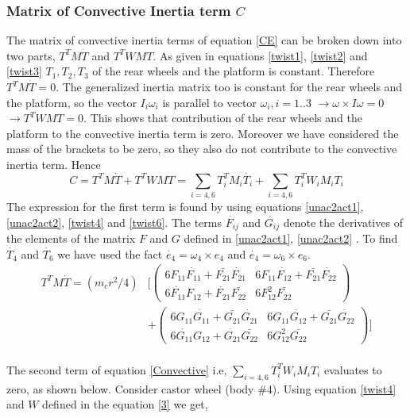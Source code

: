 \subsubsection{Matrix of Convective Inertia term $C$}
The matrix of convective inertia terms of equation \ref{CE} can be broken down into two parts, $T^TM\dot{T}$ and $T^TWMT$.  As given in equations \ref{twist1}, \ref{twist2} and \ref{twist3} $T_1,T_2,T_3$ of the rear wheels and the platform is constant. Therefore $T^TM\dot{T}=0$. The generalized inertia matrix too is constant for the rear wheels and the platform, so the vector $I_i\omega_i$ is parallel to vector $\omega_i, i=1..3$ $\rightarrow\omega\times I\omega=0$ $\rightarrow T^TWMT =0$. This shows that contribution of the rear wheels and the platform  to the convective inertia term is zero. Moreover we have considered the mass of the brackets to be zero, so they also do not contribute to the convective inertia term. Hence
\begin{equation}
\label{Convective}
C=T^TM\dot{T}+T^TWMT=\sum_{i=4,6}T^T_iM_i\dot{T_i}+\sum_{i=4,6}T_i^TW_iM_iT_i
\end{equation}
The expression for the first term is found by using equations \ref{unac2act1}, \ref{unac2act2}, \ref{twist4} and \ref{twist6}. The terms $\dot{F_{ij}}$ and $\dot{G_{ij}}$ denote the derivatives of the elements of the matrix $F$ and $G$ defined in \ref{unac2act1}, \ref{unac2act2} . To find $\dot{T_4}$ and  $ \dot{T_6}$ we have used the fact $\dot{e_4}=\omega_4 \times e_4 $ and $\dot{e_4}=\omega_6 \times e_6 $. 
\begin{equation}
\label{corr1}
\begin{split}
T^TM\dot{T}=
(m_cr^2/4)& \biggl[ \begin{pmatrix}
6F_{11}\dot{F_{11}}+\bar{F_{21}}\dot{F_{21}} & 6F_{11}\dot{F_{12}}+\bar{F_{21}}\dot{F_{22}}\\
6\dot{F_{11}}F_{12}+\dot{F_{21}}\bar{F_{22}} & 6F_{12}^2\bar{F_{22}}
\end{pmatrix}\\
&+\begin{pmatrix}
6G_{11}\dot{G_{11}}+\bar{G_{21}}\dot{G_{21}} & 6G_{11}\dot{G_{12}}+\bar{G_{21}}\dot{G_{22}}\\
6\dot{G_{11}}G_{12}+\dot{G_{21}}\bar{G_{22}} & 6G_{12}^2\bar{G_{22}}
\end{pmatrix} \biggr]
\end{split}
\end{equation}
\\
The second term of equation \ref{Convective} i.e, $ \sum_{i=4,6}T_i^TW_iM_iT_i$ evaluates to zero, as shown below. Consider castor wheel (body \#4). Using equation \ref{twist4} and  $W$ defined in the equation \ref{3} we get,
